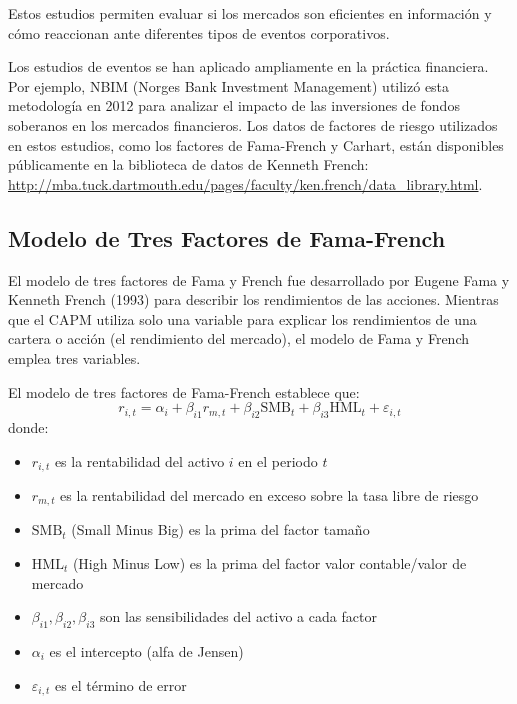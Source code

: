 Estos estudios permiten evaluar si los mercados son eficientes en información y cómo reaccionan ante diferentes tipos de eventos corporativos.

Los estudios de eventos se han aplicado ampliamente en la práctica financiera. Por ejemplo, NBIM (Norges Bank Investment Management) utilizó esta metodología en 2012 para analizar el impacto de las inversiones de fondos soberanos en los mercados financieros. Los datos de factores de riesgo utilizados en estos estudios, como los factores de Fama-French y Carhart, están disponibles públicamente en la biblioteca de datos de Kenneth French: \url{http://mba.tuck.dartmouth.edu/pages/faculty/ken.french/data_library.html}.

\subsection{Modelo de Tres Factores de Fama-French}

El modelo de tres factores de Fama y French fue desarrollado por Eugene Fama y Kenneth French (1993) para describir los rendimientos de las acciones. Mientras que el CAPM utiliza solo una variable para explicar los rendimientos de una cartera o acción (el rendimiento del mercado), el modelo de Fama y French emplea tres variables.

\begin{definicion}
El modelo de tres factores de Fama-French establece que:
\begin{equation}
r_{i,t} = \alpha_i + \beta_{i1} r_{m,t} + \beta_{i2} \text{SMB}_t + \beta_{i3} \text{HML}_t + \varepsilon_{i,t}
\end{equation}
donde:
\begin{itemize}
\item $r_{i,t}$ es la rentabilidad del activo $i$ en el periodo $t$
\item $r_{m,t}$ es la rentabilidad del mercado en exceso sobre la tasa libre de riesgo
\item $\text{SMB}_t$ (Small Minus Big) es la prima del factor tamaño
\item $\text{HML}_t$ (High Minus Low) es la prima del factor valor contable/valor de mercado
\item $\beta_{i1}, \beta_{i2}, \beta_{i3}$ son las sensibilidades del activo a cada factor
\item $\alpha_i$ es el intercepto (alfa de Jensen)
\item $\varepsilon_{i,t}$ es el término de error
\end{itemize}
\end{definicion}

